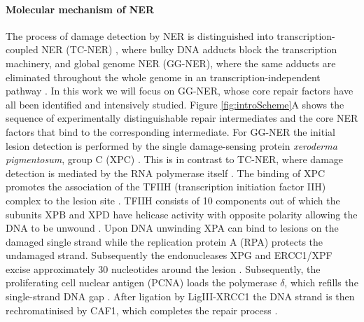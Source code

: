 \paragraph{Molecular mechanism of NER}
\label{sec:NERmechanism}
The process of damage detection by NER is distinguished into transcription-coupled NER (TC-NER) \cite{Sugasawa:2005:Cell:15882621,Gillet:2006:Chem-Rev:16464005}, where bulky DNA adducts block the transcription machinery, and global genome NER (GG-NER), where the same adducts are eliminated throughout the whole genome in an transcription-independent pathway \cite{Fousteri2008}. In this work we will focus on GG-NER, whose core repair factors have all been identified and intensively studied. Figure \ref{fig:introScheme}A shows the sequence of experimentally distinguishable repair intermediates and the core NER factors that bind to the corresponding intermediate. For GG-NER the initial lesion detection is performed by the single damage-sensing protein \textit{xeroderma pigmentosum}, group C (XPC) \cite{Sugasawa:1998:Mol-Cell:9734359,Volker2001}. This is in contrast to TC-NER, where damage detection is mediated by the RNA polymerase itself \cite{Hanawalt2008}. The binding of XPC promotes the association of the TFIIH (transcription initiation factor IIH) complex to the lesion site \cite{Yokoi:2000:J-Biol-Chem:10734143,Riedl2003,Volker2001}. TFIIH consists of 10 components out of which the subunits XPB and XPD have helicase activity with opposite polarity allowing the DNA to be unwound \cite{Tapias2004,Compe2012}. Upon DNA unwinding XPA can bind to lesions on the damaged single strand while the replication protein A (RPA) protects the undamaged strand. Subsequently the endonucleases XPG and ERCC1/XPF excise approximately 30 nucleotides around the lesion \cite{Evans1997,deLaat:1998:Genes-Dev:9716411,Wakasugi:1997:J-Biol-Chem:9188507,Park:2006:FEBS-J:16623697,Camenisch:2006:Nat-Struct-Mol-Biol:16491090}. Subsequently, the proliferating cell nuclear antigen (PCNA) loads the polymerase $\delta$, which refills the single-strand DNA gap \cite{Hoeijmakers:2001:Nature:11357144,Essers2005,Moser:2007:Mol-Cell:17643379}. After ligation by LigIII-XRCC1 the DNA strand is then rechromatinised by CAF1, which completes the repair process \cite{Green:2003:EMBO-J:14517254,Polo2006} . 

